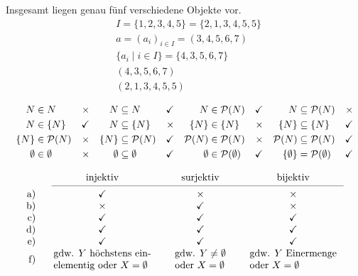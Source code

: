 \begin{loes}
    Insgesamt liegen genau fünf verschiedene Objekte vor.
    \begin{align*}
        &I = \{1,2,3,4,5\} = \{2,1,3,4,5,5\} \\
        &a = (a_i)_{i\in I} = (3,4,5,6,7) \\
        &\{a_i\mid i \in I\} = \{4,3,5,6,7\} \\
        &(4,3,5,6,7) \\
        &(2,1,3,4,5,5)
    \end{align*}
\end{loes}


\begin{loes} \quad
    \begin{align*}
        \relax N & \in \relax N & \times & & \relax N & \subseteq \relax N & \checkmark && \relax N & \in \mathcal P(\relax N) & \checkmark & &  \relax N & \subseteq \mathcal P(\relax N) & \times &\\
        \relax N & \in \{ \relax N\} & \checkmark && \relax N & \subseteq \{ \relax N\} & \times && \{ \relax N\} & \in \{ \relax N\} & \times && \{\relax N\} & \subseteq \{ \relax N\} & \checkmark & \\
        \{\relax N\} & \in \mathcal P(\relax N) & \times && \{ \relax N\} & \subseteq \mathcal P(\relax N) & \checkmark && \mathcal P(\relax N) & \in \mathcal P(\relax N) & \times && \mathcal P(\relax N) & \subseteq \mathcal P(\relax N) & \checkmark & \\
        \emptyset & \in \emptyset & \times && \emptyset &\subseteq \emptyset & \checkmark && \emptyset & \in \mathcal P(\emptyset) & \checkmark && \{\emptyset\} & = \mathcal P(\emptyset) & \checkmark &
    \end{align*}
\end{loes}


\begin{loes} \quad
    \[ \begin{tabular}{rccc}
        & injektiv  & surjektiv & bijektiv \\
        \cmidrule(l{1em}r{0.5em}){2-4}
        a) & \checkmark & $\times$ & $\times$ \\
        b) & $\times$ & \checkmark & $\times$ \\
        c) & \checkmark & \checkmark & \checkmark \\
        d) & \checkmark & \checkmark & \checkmark \\
        e) & \checkmark & \checkmark & \checkmark \\
        f) & \begin{tabular}{l} gdw. $Y$ höchstens ein- \\ elementig oder $X=\emptyset$ \end{tabular} & \begin{tabular}{l} gdw. $Y\neq\emptyset$ \\ oder $X=\emptyset$ \end{tabular} & \begin{tabular}{l} gdw. $Y$ Einermenge \\ oder $X=\emptyset$ \end{tabular}
    \end{tabular} \]
\end{loes}


